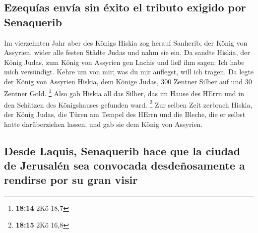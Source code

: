 \hypertarget{ezequuxedas-envuxeda-sin-uxe9xito-el-tributo-exigido-por-senaquerib}{%
\subsection{Ezequías envía sin éxito el tributo exigido por
Senaquerib}\label{ezequuxedas-envuxeda-sin-uxe9xito-el-tributo-exigido-por-senaquerib}}

 Im vierzehnten Jahr aber des Königs Hiskia zog herauf
Sanherib, der König von Assyrien, wider alle festen Städte Judas und
nahm sie ein.  Da sandte Hiskia, der König Judas, zum
König von Assyrien gen Lachis und ließ ihm sagen: Ich habe mich
versündigt. Kehre um von mir; was du mir auflegst, will ich tragen. Da
legte der König von Assyrien Hiskia, dem Könige Judas, 300 Zentner
Silber auf und 30 Zentner Gold. \footnote{\textbf{18:14} 2Kö 18,7}
 Also gab Hiskia all das Silber, das im Hause des HErrn
und in den Schätzen des Königshauses gefunden ward. \footnote{\textbf{18:15}
  2Kö 16,8}  Zur selben Zeit zerbrach Hiskia, der König
Judas, die Türen am Tempel des HErrn und die Bleche, die er selbst hatte
darüberziehen lassen, und gab sie dem König von Assyrien.

\hypertarget{desde-laquis-senaquerib-hace-que-la-ciudad-de-jerusaluxe9n-sea-convocada-desdeuxf1osamente-a-rendirse-por-su-gran-visir}{%
\subsection{Desde Laquis, Senaquerib hace que la ciudad de Jerusalén sea
convocada desdeñosamente a rendirse por su gran
visir}\label{desde-laquis-senaquerib-hace-que-la-ciudad-de-jerusaluxe9n-sea-convocada-desdeuxf1osamente-a-rendirse-por-su-gran-visir}}

